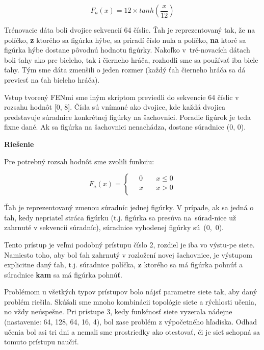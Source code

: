 \documentclass[12pt]{article}
\newcommand{\mysmallsection}[1]{\vspace{0.5cm}{\centering\large\textbf{#1}\\}\normalsize\vspace{0.5cm}}
\begin{document}
\begin{equation}
F_a(x)=12 \times tanh(\frac{x}{12})
\end{equation}

Trénovacie dáta boli dvojice sekvencií 64 číslic. Ťah je reprezentovaný tak, že na políčko, \textbf{z} ktorého sa figúrka hýbe, sa priradí číslo nula a políčko, \textbf{na} ktoré sa figúrka hýbe dostane pôvodnú hodnotu figúrky. Nakoľko v~tré-novacích dátach boli ťahy ako pre bieleho, tak i čierneho hráča, rozhodli sme sa používať iba biele ťahy. Tým sme dáta zmenšili o jeden rozmer (každý ťah čierneho hráča sa dá previesť na ťah bieleho hráča).

\newpage

\mysmallsection{Prístup 2}

Vstup tvorený FENmi sme iným skriptom previedli do sekvencie 64 číslic v rozsahu hodnôt [0, 8]. Čísla sú vnímané ako dvojice, kde každá dvojica predstavuje súradnice konkrétnej figúrky na šachovnici. Poradie figúrok je teda fixne dané. Ak sa figúrka na šachovnici nenachádza, dostane súradnice (0, 0).

{\vspace*{0.5cm}\centering\textbf{Riešenie}\\}

Pre potrebný rozsah hodnôt sme zvolili funkciu:

\[ F_a(x) =
  \begin{cases}
    \quad 0  & \quad x \leq 0 \\
    \quad x  & \quad x > 0\\
  \end{cases}
\]

Ťah je reprezentovaný zmenou súradníc jednej figúrky. V prípade, ak sa jedná o ťah, kedy nepriateľ stráca figúrku (t.j. figúrka sa presúva na~súrad-nice už zahrnuté v sekvencii súradníc), súradnice vyhodenej figúrky sú~(0,~0).

\mysmallsection{Prístup 3}

Tento prístup je veľmi podobný prístupu číslo 2, rozdiel je iba vo výstu-pe siete. Namiesto toho, aby bol ťah zahrnutý v rozložení novej šachovnice, je výstupom explicitne daný ťah, t.j. súradnice políčka, \textbf{z} ktorého sa má figúrka pohnúť a súradnice \textbf{kam} sa má figúrka pohnúť.

\mysmallsection{Výsledky}

Problémom u všetkých typov prístupov bolo nájsť parametre siete tak, aby daný problém riešila. Skúšali sme mnoho kombinácii topológie siete a rýchlosti učenia, no vždy neúspešne. Pri prístupe 3, kedy funkčnosť siete vyzerala nádejne (nastavenie: 64, 128, 64, 16, 4), bol zase problém z výpočetného hľadiska. Odhad učenia bol asi tri dni a nemali sme prostriedky ako otestovať, či je sieť schopná sa tomuto prístupu naučiť.
\end{document}
